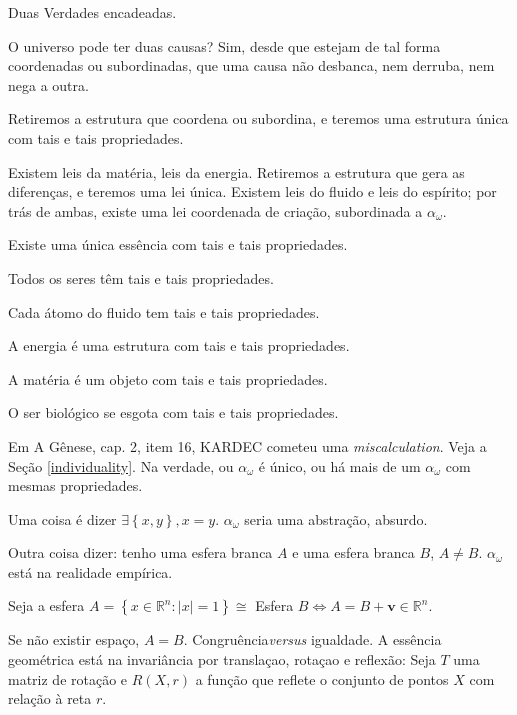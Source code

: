\documentclass[12pt,a4paper]{article}
\begin{document}
			\begin{flushright}
			\end{flushright}

			Duas Verdades encadeadas.

			O universo pode ter duas causas? Sim, desde que estejam de tal forma coordenadas ou subordinadas, que uma causa n\~ao desbanca, nem derruba, nem nega a outra.

			Retiremos a estrutura que coordena ou subordina, e teremos uma estrutura \'unica com tais e tais propriedades.

			Existem leis da mat\'eria, leis da energia. Retiremos a estrutura que gera as diferen\c{c}as, e teremos uma lei \'unica. Existem leis do fluido e leis do esp\'irito; por tr\'as de ambas, existe uma lei coordenada de cria\c{c}\~ao, subordinada a $ \alpha_\omega $.

			Existe uma \'unica ess\^encia com tais e tais propriedades.

			Todos os seres t\^em tais e tais propriedades.

			Cada \'atomo do fluido tem tais e tais propriedades.

			A energia \'e uma estrutura com tais e tais propriedades.

			A mat\'eria \'e um objeto com tais e tais propriedades.

			O ser biol\'ogico se esgota com tais e tais propriedades.

			\begin{flushright}
			\end{flushright}

			Em A G\^enese\cite{genese}, cap. 2, item 16, KARDEC cometeu uma \emph{miscalculation}. Veja a Se\c{c}\~ao \ref{individuality}. Na verdade, ou $ \alpha_\omega $ \'e \'unico, ou h\'a mais de um $ \alpha_\omega $ com mesmas propriedades.

			Uma coisa \'e dizer $ \exists \left\{ x, y \right\} , x = y $. $ \alpha_\omega $ seria uma abstra\c{c}\~ao, absurdo.

			Outra coisa dizer: tenho uma esfera branca $A$ e uma esfera branca $B$, $A \neq B$. $ \alpha_\omega $ est\'a na realidade emp\'irica.

			Seja a esfera $A = \left\{x \in \mathbb{R} ^ n : |x| = 1 \right\} \cong $ Esfera $B \Leftrightarrow A = B + \mathbf{v} \in \mathbb{R} ^ n$.

			Se n\~ao existir espa\c{c}o, $A = B$. Congru\^encia\footnotemark[1] \emph{versus} igualdade. A ess\^encia geom\'etrica est\'a na invari\^ancia por transla\c{c}ao, rota\c{c}ao e reflex\~ao: Seja $T$ uma matriz de rota\c{c}\~ao e $R(X, r)$ a fun\c{c}\~ao que reflete o conjunto de pontos $X$ com rela\c{c}\~ao \`a reta $r$.
\end{document}
